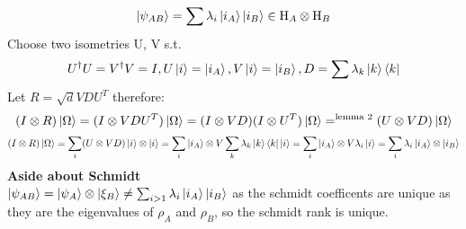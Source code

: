 \documentclass{article}
\begin{document}
$$
\ket{\psi_{AB}} = \sum \lambda_i \ket{i_A} \ket{i_B} \in \mathrm{H}_A \otimes \mathrm{H}_B
$$
Choose two isometries U, V s.t.
$$
U^{\dagger}U = V^{\dagger}V = I, U\ket{i} = \ket{i_A}, V\ket{i} = \ket{i_B}, D = \sum \lambda_k \ket{k} \bra{k}
$$
Let $R = \sqrt{d} V D U^T$ therefore:
$$
(I \otimes R) \ket{\Omega} = (I \otimes VDU^T) \ket{\Omega} = (I \otimes VD)(I \otimes U^T) \ket{\Omega} =^{\text{lemma 2}}  (U \otimes VD)\ket{\Omega}
$$
$$
(I \otimes R) \ket{\Omega} = \sum_i (U \otimes VD)\ket{i} \otimes \ket{i} = \sum_i \ket{i_A} \otimes V \sum_k \lambda_k \ket{k} \bra{k} \ket{i} =  \sum_i \ket{i_A} \otimes V \lambda_i \ket{i} =  \sum_i \lambda_i  \ket{i_A} \otimes \ket{i_B} 
$$
\textbf{Aside about Schmidt}\\
$\ket{\psi_{AB}} = \ket{\psi_A} \otimes \ket{\xi_B} \neq \sum_{i>1} \lambda_i \ket{i_A}\ket{i_B}$ as the schmidt coefficents are unique as they are the eigenvalues of $\rho_A$ and $\rho_B$, so the schmidt rank is unique.
\end{document}
